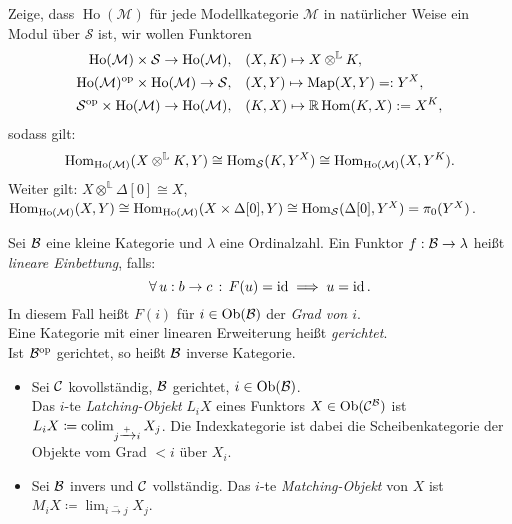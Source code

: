 \documentclass{cheat-sheet}
\newcommand{\ModC}{\mathcal{M}} %
\DeclareMathOperator{\Ho}{Ho} %
\newcommand{\LL}{\mathbb{L}} %
\newcommand{\RD}[1]{\mathbb{R} #1} %
\newcommand{\Simpl}{\mathcal{S}} %
\DeclareMathOperator{\Map}{Map} %
\begin{document}
\begin{ziel}
  Zeige, dass $\Ho(\ModC)$ für jede Modellkategorie $\ModC$ in natürlicher Weise ein Modul über $\Simpl$ ist, \dh{} wir wollen Funktoren
  \begin{align*}
    \Ho(\ModC) \times \Simpl \to \Ho(\ModC), \quad & (X, K) \mapsto X \otimes^\LL K, \\
    \Ho(\ModC)^\op \times \Ho(\ModC) \to \Simpl, \quad & (X, Y) \mapsto \Map(X, Y) =: Y^X, \\
    \Simpl^\op \times \Ho(\ModC) \to \Ho(\ModC), \quad & (K, X) \mapsto \RD{\Hom(K, X)} := X^K,
  \end{align*}
  sodass gilt:
  \[ \Hom_{\Ho(\ModC)}(X \otimes^\LL K, Y) \cong \Hom_\Simpl(K, Y^X) \cong \Hom_{\Ho(\ModC)}(X, Y^K). \]
  Weiter gilt: $X \otimes^\LL \Delta[0] \cong X$, \dh{} $\Hom_{\Ho(\ModC)}(X, Y) \cong \Hom_{\Ho(\ModC)}(X \times \Delta[0], Y) \cong \Hom_\Simpl(\Delta[0], Y^X) = \pi_0(Y^X)$.
\end{ziel}


\begin{defn}
  Sei $\mathcal{B}$ eine kleine Kategorie und $\lambda$ eine Ordinalzahl.
  Ein Funktor $f : \mathcal{B} \to \lambda$ heißt \emph{lineare Einbettung}, falls:
  \[ \forall \, {u : b \to c} \,:\, F(u) = \operatorname{id} \implies u = \operatorname{id}. \]
  In diesem Fall heißt $F(i)$ für $i \in \operatorname{Ob}(\mathcal{B})$ der \emph{Grad von $i$}. \\
  Eine Kategorie mit einer linearen Erweiterung heißt \emph{gerichtet}. \\
  Ist $\mathcal{B}^{\mathrm{op}}$ gerichtet, so heißt $\mathcal{B}$ inverse Kategorie.
\end{defn}

\begin{defn}
  \begin{itemize}
    \item Sei $\mathcal{C}$ kovollständig, $\mathcal{B}$ gerichtet, $i \in \operatorname{Ob}(\mathcal{B})$. \\
    Das $i$-te \emph{Latching-Objekt} $L_i X$ eines Funktors $X \in \operatorname{Ob}(\mathcal{C}^{\mathcal{B}})$ ist $L_i X \coloneqq \operatorname{colim}_{j \xrightarrow{{+}} i} X_j$.
    Die Indexkategorie ist dabei die Scheibenkategorie der Objekte vom Grad $< i$ über $X_i$.
    \item Sei $\mathcal{B}$ invers und $\mathcal{C}$ vollständig. Das $i$-te \emph{Matching-Objekt} von $X$ ist
    $M_i X \coloneqq \lim_{i \xrightarrow{{-}} j} X_j$.
  \end{itemize}
\end{defn}
\end{document}
